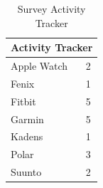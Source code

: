 \begin{table}[H]
\centering
\begin{tabular}{ |l|l| }
  \hline
  \multicolumn{2}{|c|}{Activity Tracker} \\
  \hline
Apple Watch & 2\\ 
\hline
Fenix & 1\\
\hline
Fitbit & 5\\ 
  \hline
  Garmin & 5 \\ 
  \hline
  Kadens & 1\\ 
  \hline
   Polar & 3\\ 
  \hline
   Suunto & 2\\ 
  \hline
\end{tabular}
\label{tab:3}
\caption{Survey Activity Tracker}
\end{table}

